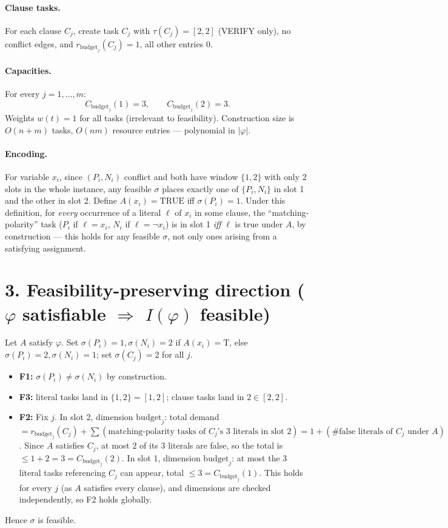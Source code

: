 \documentclass[11pt]{article}
\begin{document}
\paragraph{Clause tasks.} For each clause $C_j$, create task $C_j$ with
$\tau(C_j) = [2,2]$ (VERIFY only), no conflict edges, and
$r_{\mathrm{budget}_j}(C_j) = 1$, all other entries $0$.

\paragraph{Capacities.} For every $j=1,\dots,m$:
$$ C_{\mathrm{budget}_j}(1) = 3, \qquad C_{\mathrm{budget}_j}(2) = 3. $$
Weights $w(t)=1$ for all tasks (irrelevant to feasibility). Construction size is
$O(n+m)$ tasks, $O(nm)$ resource entries — polynomial in $|\varphi|$.

\paragraph{Encoding.} For variable $x_i$, since $(P_i,N_i)$ conflict and both have window
$\{1,2\}$ with only $2$ slots in the whole instance, any feasible $\sigma$ places exactly one
of $\{P_i,N_i\}$ in slot 1 and the other in slot 2. Define $A(x_i) = \mathrm{TRUE}$ iff
$\sigma(P_i)=1$. Under this definition, for \emph{every} occurrence of a literal $\ell$ of
$x_i$ in some clause, the ``matching-polarity'' task ($P_i$ if $\ell=x_i$, $N_i$ if
$\ell=\lnot x_i$) is in slot 1 \emph{iff} $\ell$ is true under $A$, by construction — this
holds for any feasible $\sigma$, not only ones arising from a satisfying assignment.

\section*{3. Feasibility-preserving direction ($\varphi$ satisfiable $\Rightarrow$ $I(\varphi)$ feasible)}
Let $A$ satisfy $\varphi$. Set $\sigma(P_i)=1,\sigma(N_i)=2$ if $A(x_i)=\mathrm{T}$, else
$\sigma(P_i)=2,\sigma(N_i)=1$; set $\sigma(C_j)=2$ for all $j$.
\begin{itemize}[leftmargin=*]
\item \textbf{F1:} $\sigma(P_i)\neq\sigma(N_i)$ by construction. \checkmark
\item \textbf{F3:} literal tasks land in $\{1,2\}=[1,2]$; clause tasks land in
  $2 \in [2,2]$. \checkmark
\item \textbf{F2:} Fix $j$. In slot 2, dimension $\mathrm{budget}_j$: total demand
  $= r_{\mathrm{budget}_j}(C_j) + \sum(\text{matching-polarity tasks of } C_j\text{'s
  3 literals in slot 2})= 1 + (\#\text{false literals of }C_j\text{ under }A)$.
  Since $A$ satisfies $C_j$, at most $2$ of its $3$ literals are false, so the total is
  $\le 1+2=3=C_{\mathrm{budget}_j}(2)$. In slot 1, dimension $\mathrm{budget}_j$: at most
  the $3$ literal tasks referencing $C_j$ can appear, total $\le 3 = C_{\mathrm{budget}_j}(1)$.
  This holds for every $j$ (as $A$ satisfies every clause), and dimensions are checked
  independently, so F2 holds globally. \checkmark
\end{itemize}
Hence $\sigma$ is feasible.
\end{document}
